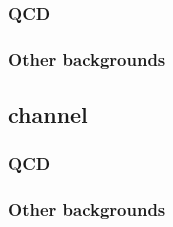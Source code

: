 \subsubsection{\texorpdfstring{\Wjets}{W+jets}}
\label{sec:mssm_bkgs_mtet_wjets}

\subsubsection{QCD}
\label{sec:mssm_bkgs_mtet_qcd}

\subsubsection{\texorpdfstring{\ttbar}{ttbar}}
\label{sec:mssm_bkgs_mtet_tt}

\subsubsection{Other backgrounds}
\label{sec:mssm_bkgs_mtet_other}

\subsection{\texorpdfstring{\tautau channel}{tautau channel}}
\label{sec:mssm_bkgs_tt}

\subsubsection{\texorpdfstring{\Ztautau}{Z to tau tau}}
\label{sec:mssm_bkgs_tt_ztt}

\subsubsection{QCD}
\label{sec:mssm_bkgs_tt_qcd}

\subsubsection{\texorpdfstring{\Wjets}{W+jets}}
\label{sec:mssm_bkgs_tt_wjets}

\subsubsection{\texorpdfstring{\ttbar}{ttbar}}
\label{sec:mssm_bkgs_tt_tt}

\subsubsection{Other backgrounds}
\label{sec:mssm_bkgs_tt_other}

